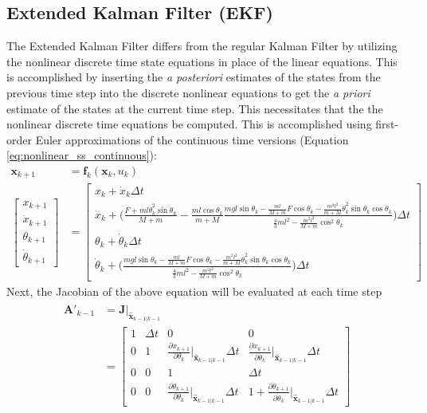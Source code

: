 \documentclass{article}
\newcommand{\matr}[1]{\bm{#1}}     %
\begin{document}
\subsection{Extended Kalman Filter (EKF)}
The Extended Kalman Filter differs from the regular Kalman Filter by utilizing the nonlinear discrete time state equations in place of the linear equations. This is accomplished by inserting the \textit{a posteriori} estimates of the states from the previous time step into the discrete nonlinear equations to get the \textit{a priori} estimate of the states at the current time step. This necessitates that the the nonlinear discrete time equations be computed. This is accomplished using first-order Euler approximations of the continuous time versions (Equation \ref{eq:nonlinear_ss_continuous}):
\begin{equation}
\begin{aligned}
\matr{x}_{k+1} &= \matr{f}_k (\matr{x}_k,u_k) \\
\begin{bmatrix}
x_{k+1} \\[8pt]
\dot{x}_{k+1} \\[8pt]
\theta_{k+1} \\[8pt]
\dot{\theta}_{k+1}
\end{bmatrix} &= \begin{bmatrix}
x_k + \dot{x}_k \Delta t \\
\dot{x}_k + \biggr(\frac{F+ml\dot{\theta}_k^2\sin\theta_k}{M+m} -\frac{ml\cos\theta_k}{m+M}\frac{mgl\sin\theta_k- \frac{ml}{M+m} F\cos\theta_k -\frac{m^2l^2}{m+M}\dot{\theta}_k^2\sin\theta_k\cos\theta_k}{\frac{4}{3}ml^2-\frac{m^2l^2}{M+m}\cos^2 \theta_k}\biggr) \Delta t  \\
\theta_k + \dot{\theta}_k \Delta t \\
\dot{\theta}_k + \biggr(\frac{mgl\sin\theta_k - \frac{ml}{M+m} F\cos\theta_k -\frac{m^2l^2}{m+M}\dot{\theta}_k^2\sin\theta_k\cos\theta_k}{\frac{4}{3}ml^2-\frac{m^2l^2}{M+m}\cos^2 \theta_k}\biggr) \Delta t
\end{bmatrix}
\end{aligned}
\label{eq:nonlinear_discrete}
\end{equation}
Next, the Jacobian of the above equation will be evaluated at each time step
\begin{align}
\begin{aligned}
\matr{A'}_{k-1} &= \matr{J}\bigr|_{\hat{\matr{x}}_{k-1|k-1}} \\
&= \begin{bmatrix}
1 & \Delta t & 0 & 0 \\[8pt]
0 & 1 & \frac{\partial \dot{x}_{k+1}}{\partial \theta_k}\Big|_{\hat{\matr{x}}_{k-1|k-1}}\Delta t & \frac{\partial \dot{x}_{k+1}}{\partial \dot{\theta}_k}\Big|_{\hat{\matr{x}}_{k-1|k-1}}\Delta t \\[8pt]
0 & 0 & 1 & \Delta t \\[8pt]
0 & 0 & \frac{\partial \dot{\theta}_{k+1}}{\partial \theta_k}\Big|_{\hat{\matr{x}}_{k-1|k-1}}\Delta t & 1+\frac{\partial \dot{\theta}_{k+1}}{\partial \dot{\theta}_k}\Big|_{\hat{\matr{x}}_{k-1|k-1}}\Delta t
\end{bmatrix}
\end{aligned}
\label{eq:jacobian_EKF}
\end{align}
\end{document}
